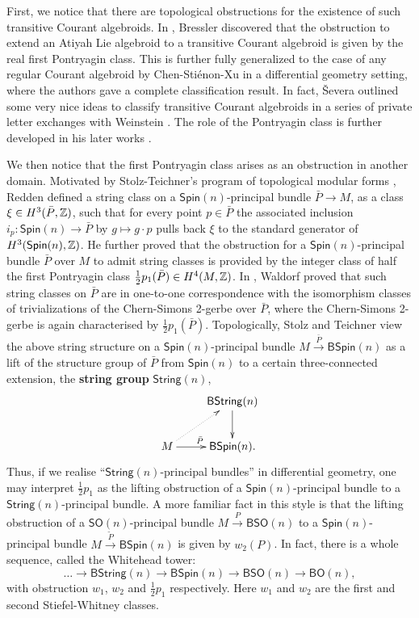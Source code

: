 \documentclass[letterpaper,10pt, oneside]{article} %
\newcommand{\String}{\mathsf{String}}%
\newcommand{\BString}{\mathsf{BString}}%
\newcommand{\Spin}{\mathsf{Spin}}%
\newcommand{\BSpin}{\mathsf{BSpin}}%
\newcommand{\half}{\frac{1}{2}}
\newcommand{\SO}{\mathsf {SO}}
\newcommand{\BSO}{\mathsf {BSO}}
\newcommand{\BO}{\mathsf {BO}}
\begin{document}
First, we notice that there are topological obstructions for the
existence of such transitive Courant algebroids. In
\cite{Bressler:Pclass}, Bressler discovered that the obstruction to
extend an Atiyah Lie algebroid to a transitive Courant algebroid is
given by the real first Pontryagin class. This is further fully
generalized to the case of any regular Courant algebroid by
Chen-Sti\'enon-Xu \cite{ChenRCA} in a differential geometry  setting, where the authors gave a complete classification result. In fact, \v{S}evera outlined some very nice ideas to classify transitive Courant algebroids in a series of private letter exchanges with Weinstein \cite{sevlet}. The role of the Pontryagin class is further developed in his later works \cite{sev15, sev16}.

We then notice that the first Pontryagin class arises as an obstruction in another domain. Motivated by  Stolz-Teichner's program of topological modular forms \cite{stolz-teichner:elliptic-obj}, Redden \cite{redden:thesis} defined a string class on a $\Spin(n)$-principal bundle $\bar{P}\to M$,  as a class $\xi \in H^3(\bar{P}, \mathbb Z)$, such that for every point $p \in \bar{P}$ the associated inclusion $i_p: \Spin(n) \to \bar{P}$ by $g\mapsto g\cdot p$ pulls back $\xi$ to the standard generator of $H^3(\Spin(n),\Z)$. He further proved that the obstruction for a $\Spin(n)$-principal bundle $\bar{P}$ over $M$ to admit string classes is provided by the integer class of half the first Pontryagin class $\half p_1(\bar{P})\in H^4(M, \Z)$.  In \cite{waldorf:string-conn}, Waldorf proved that such string classes on $\bar{P}$ are in one-to-one correspondence with the isomorphism classes of trivializations of the Chern-Simons 2-gerbe over $\bar{P}$, where the Chern-Simons 2-gerbe is again characterised by $\half p_1(\bar{P})$. Topologically, Stolz and Teichner view the above string structure on a $\Spin(n)$-principal bundle $ M\xrightarrow{\bar{P}} \BSpin(n)$ as a lift of the structure group of $\bar{P}$ from $\Spin(n)$ to a certain three-connected extension, the {\bf string group} $\String(n)$,
\[
\xymatrix{ & {\BString(n)} \ar[d] \\
M \ar@{.>}[ur] \ar[r]^{\bar{P}} & \BSpin(n).
}
\]
Thus, if we realise ``$\String(n)$-principal bundles'' in differential geometry, one may interpret $\half p_1$  as the lifting obstruction of a $\Spin(n)$-principal bundle to a $\String(n)$-principal bundle. A more familiar fact in this style is that the  lifting obstruction of a $\SO(n)$-principal bundle $M\xrightarrow{P} \BSO(n)$ to a $\Spin(n)$-principal bundle $M\xrightarrow{\tilde{P}} \BSpin(n)$ is given by $w_2(P)$.  In fact, there is a whole sequence, called the Whitehead tower:
\[\dots \to \BString(n)\to \BSpin(n)\to \BSO(n)\to \BO(n), \]
with obstruction $w_1$, $w_2$ and $\half p_1$ respectively. Here $w_1$ and $w_2$ are the first and second  Stiefel-Whitney classes.
\end{document}
